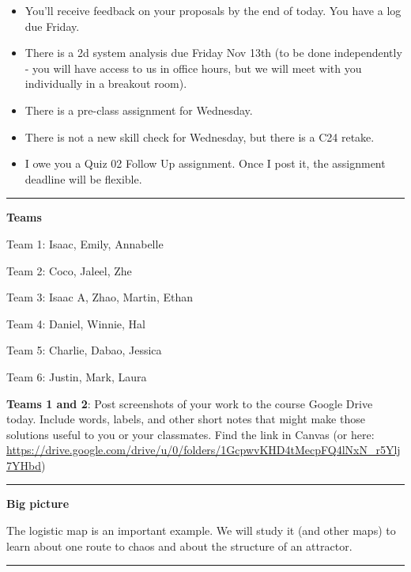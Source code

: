 \documentclass[12pt,letterpaper,noanswers]{exam}
\begin{document}
 \pdfpageheight 11in 
  \pdfpagewidth 8.5in

\noindent 




\begin{itemize}
\itemsep0em
\item You'll receive feedback on your proposals by the end of today.  You have a log due Friday.
\item There is a 2d system analysis due Friday Nov 13th (to be done independently - you will have access to us in office hours, but we will meet with you individually in a breakout room).
\item There is a pre-class assignment for Wednesday.
\item There is not a new skill check for Wednesday, but there is a C24 retake.
\item I owe you a Quiz 02 Follow Up assignment.  Once I post it, the assignment deadline will be flexible.
\end{itemize}

\hrule
\vspace{0.2cm}



\noindent\textbf{Teams}

Team 1: Isaac, Emily, Annabelle

Team 2: Coco, Jaleel, Zhe

Team 3: Isaac A, Zhao, Martin, Ethan

Team 4: Daniel, Winnie, Hal

Team 5: Charlie, Dabao, Jessica

Team 6: Justin, Mark, Laura


\noindent \textbf{Teams 1 and 2}: Post screenshots of your work to the course Google Drive today.  Include words, labels, and other short notes that might make those solutions useful to you or your classmates.  Find the link in Canvas (or here: \url{https://drive.google.com/drive/u/0/folders/1GcpwvKHD4tMecpFQ4lNxN_r5Ylj7YHbd})


\vspace{0.2cm}

\hrule
\vspace{0.2cm}


\noindent\textbf{Big picture}

The logistic map is an important example.  We will study it (and other maps) to learn about one route to chaos and about the structure of an attractor.




\vspace{0.2cm}
\hrule
\vspace{0.2cm}
\end{document}
